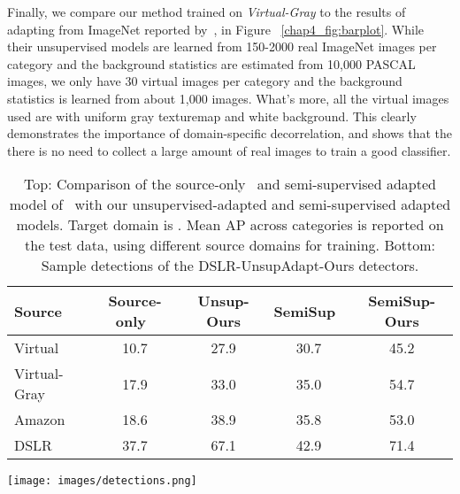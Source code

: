 \documentclass[graybox]{svmult}
\begin{document}
Finally, we compare our method trained on \textit{Virtual-Gray} to the results of adapting from ImageNet reported by~\cite{ICRA14}, in Figure ~\ref{chap4_fig:barplot}.
While their unsupervised models are learned from 150-2000 real ImageNet images per category and the background statistics are estimated from 10,000 PASCAL images, we only have 30 virtual images per category and the background statistics is learned from about 1,000 images. What's more, all the virtual images used are with uniform gray texturemap and white background. This clearly demonstrates the importance of domain-specific decorrelation, and shows that the there is no need to collect a large amount of real images to train a good classifier. 

\begin{table}
\begin{small}
\begin{center}
\begin{tabular}{|l||c|c||c|c|}
\hline
Source & Source-only~\cite{who} & Unsup-Ours & SemiSup~\cite{ICRA14} & SemiSup-Ours \\ 
\hline
Virtual & 10.7  &  27.9 & 30.7 & 45.2 \\ \hline
Virtual-Gray  & 17.9 & 33.0 & 35.0 & 54.7 \\ \hline
Amazon        & 18.6 & 38.9 & 35.8 & 53.0 \\ \hline
DSLR          & 37.7 & 67.1 & 42.9 & 71.4 \\ \hline
\end{tabular}
\texttt{[image: images/detections.png]}
\end{center}
\caption{\small Top: Comparison of the source-only~\cite{who} and semi-supervised adapted model of~\cite{ICRA14} with our unsupervised-adapted and semi-supervised adapted models. Target domain is . Mean AP across categories is reported on the  test data, using different source domains for training. Bottom: Sample detections of the DSLR-UnsupAdapt-Ours detectors.}
\label{tab:office}
\end{small}
\end{table}
\end{document}
